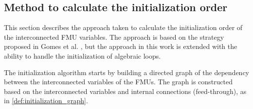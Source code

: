 \subsection{Method to calculate the initialization order}
This section describes the approach taken to calculate the initialization order of the interconnected FMU variables. The approach is based on the strategy proposed in Gomes et al. \cite{Gomes2019b, BromanCompositionCo-Simulation}, but the approach in this work is extended with the ability to handle the initialization of algebraic loops. 

The initialization algorithm starts by building a directed graph of the dependency between the interconnected variables of the FMUs. The graph is constructed based on the interconnected variables and internal connections (feed-through), as in \cref{def:initialization_graph}. 



